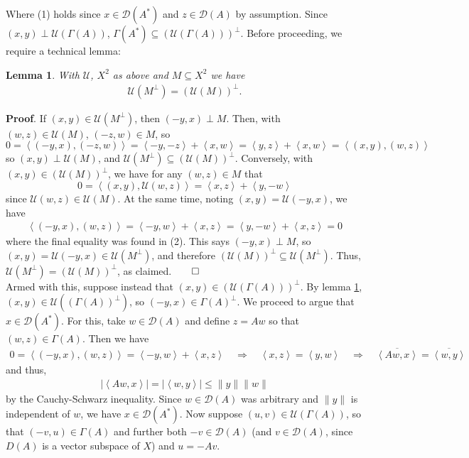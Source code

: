 \documentclass[10pt]{article}
\newcommand{\1}[1]{\mathbbm{1}_{#1}} \newcommand{\mc}[1]{\mathcal{#1}}
\newcommand{\ip}[2]{\left\langle#1,#2\right\rangle }
\newtheorem{lemma}{Lemma}
\begin{document}
    Where (1) holds since $x\in\mc{D}(A^\ast)$ and $z\in\mc{D}(A)$ by assumption. Since $(x,y)\perp \mc{U}(\Gamma(A))$, $\Gamma(A^\ast)\subseteq(\mc{U}(\Gamma(A)))^\perp$.
    Before proceeding, we require a technical lemma:
    \begin{lemma}\label{lem1}
        With $\mc{U}$, $X^2$ as above and $M\subseteq X^2$ we have
        \begin{align*}
            \mc{U}(M^\perp)=(\mc{U}(M))^\perp.
        \end{align*}
    \end{lemma}
    {\bf Proof}. If $(x,y)\in\mc{U}(M^\perp)$, then $(-y,x)\perp M$. Then, with $(w,z)\in\mc{U}(M)$, $(-z,w)\in M$, so 
    \[0=\ip{(-y,x)}{(-z,w)}=\ip{-y}{-z}+\ip{x}{w}=\ip{y}{z}+\ip{x}{w}=\ip{(x,y)}{(w,z)}\]
    so $(x,y)\perp\mc{U}(M)$, and $\mc{U}(M^\perp)\subseteq(\mc{U}(M))^\perp$. Conversely, with $(x,y)\in(\mc{U}(M))^\perp$,
    we have for any $(w,z)\in M$ that
    \[0=\ip{(x,y)}{\mc{U}(w,z)}=\ip{x}{z}+\ip{y}{-w}\tag{2}\]
    since $\mc{U}(w,z)\in\mc{U}(M)$. At the same time, noting $(x,y)=\mc{U}(-y,x)$, we have
    \begin{align*}
        \ip{(-y,x)}{(w,z)}=\ip{-y}{w}+\ip{x}{z}=\ip{y}{-w}+\ip{x}{z}=0
    \end{align*}
    where the final equality was found in (2). This says $(-y,x)\perp M$, so $(x,y)=\mc{U}(-y,x)\in\mc{U}(M^\perp)$, and therefore $(\mc{U}(M))^\perp\subseteq\mc{U}(M^\perp)$.
    Thus, $\mc{U}(M^\perp)=(\mc{U}(M))^\perp$, as claimed.\hfill{$\qed$}\\[5pt]
    Armed with this, suppose instead that $(x,y)\in(\mc{U}(\Gamma(A)))^\perp$. By lemma \ref{lem1}, $(x,y)\in\mc{U}((\Gamma(A))^\perp)$, so $(-y,x)\in\Gamma(A)^\perp$. We proceed to argue that $x\in\mc{D}(A^\ast)$.
    For this, take $w\in\mc{D}(A)$ and define $z=Aw$
    so that $(w,z)\in\Gamma(A)$. Then we have
    \begin{align*}
        0=\ip{(-y,x)}{(w,z)}=\ip{-y}{w}+\ip{x}{z}\quad\Rightarrow\quad\ip{x}{z}=\ip{y}{w}\quad\Rightarrow\quad \overline{\ip{Aw}{x}}=\overline{\ip{w}{y}}
    \end{align*}
    and thus,
    \begin{align*}
        |\ip{Aw}{x}|=|\ip{w}{y}|\leq\|y\|\|w\|
    \end{align*}
    by the Cauchy-Schwarz inequality. Since $w\in\mc{D}(A)$ was arbitrary and $\|y\|$ is independent of $w$, we have $x\in\mc{D}(A^\ast)$.
    Now suppose $(u,v)\in \mc{U}(\Gamma(A))$, so that $(-v,u)\in\Gamma(A)$ and further both $-v\in\mc{D}(A)$ (and $v\in\mc{D}(A)$, since $D(A)$ is a vector subspace of $X$) and $u=-Av$.
\end{document}
